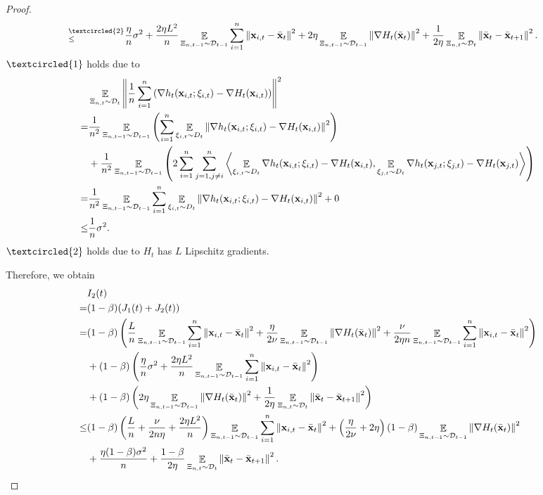 \documentclass{article}
\begin{document}
\begin{proof}
\begin{align}
\refabovecir{\le}{\textcircled{2}} & \frac{\eta}{n} \sigma^2 + \frac{2\eta L^2}{n}\EE_{ \Xi_{n,t-1} \sim \Dcal_{t-1} }\sum_{i=1}^n \lrnorm{\x_{i,t} - \bar{\x}_t }^2 + 2\eta \EE_{ \Xi_{n,t-1} \sim \Dcal_{t-1} }\lrnorm{\nabla H_t(\bar{\x}_t)}^2 + \frac{1}{2\eta} \EE_{ \Xi_{n,t} \sim \Dcal_{t} }\lrnorm{ \bar{\x}_t - \bar{\x}_{t+1}}^2.
\end{align} $\textcircled{1}$ holds due to
\begin{align}
\nonumber
& \mathop{\mathbb{E}}_{ \Xi_{n,t} \sim \mathcal{D}_{t} }\left\lVert\frac{1}{n}\sum_{i=1}^n \left(  \nabla h_t({\bf x}_{i,t};\xi_{i,t}) - \nabla H_t({\bf x}_{i,t})  \right) \right\rVert^2 \\ \nonumber
= & \frac{1}{n^2}\mathop{\mathbb{E}}_{ \Xi_{n,t-1} \sim \mathcal{D}_{t-1} }\left(  \sum_{i=1}^n \mathop{\mathbb{E}}_{ \xi_{i,t} \sim D_t }\left\lVert \nabla h_t({\bf x}_{i,t};\xi_{i,t}) - \nabla H_t({\bf x}_{i,t}) \right\rVert^2   \right) \\ \nonumber 
& + \frac{1}{n^2}\mathop{\mathbb{E}}_{ \Xi_{n,t-1} \sim \mathcal{D}_{t-1} }\left( 2\sum_{i=1}^n\sum_{j=1, j\neq i}^n\left\langle \mathop{\mathbb{E}}_{ \xi_{i,t} \sim D_t }\nabla h_t({\bf x}_{i,t};\xi_{i,t}) - \nabla H_t({\bf x}_{i,t}),  \mathop{\mathbb{E}}_{ \xi_{j,t} \sim D_t } \nabla h_t({\bf x}_{j,t};\xi_{j,t}) - \nabla H_t({\bf x}_{j,t}) \right\rangle  \right) \\ \nonumber
= & \frac{1}{n^2}\mathop{\mathbb{E}}_{ \Xi_{n,t-1} \sim \mathcal{D}_{t-1} }\sum_{i=1}^n \mathop{\mathbb{E}}_{ \xi_{i,t} \sim D_t }\left\lVert \nabla h_t({\bf x}_{i,t};\xi_{i,t}) - \nabla H_t({\bf x}_{i,t}) \right\rVert^2 + 0 \\ \nonumber
\le & \frac{1}{n} \sigma^2.
\end{align} $\textcircled{2}$ holds due to $H_t$ has $L$ Lipschitz gradients.

 Therefore, we obtain
\begin{align}
\nonumber
& I_2(t) \\ \nonumber 
= & (1-\beta)(J_1(t) + J_2(t)) \\ \nonumber
= &  (1-\beta)\left(  \frac{L}{n}\mathop{\mathbb{E}}_{ \Xi_{n,t-1} \sim \mathcal{D}_{t-1} }\sum_{i=1}^n \left\lVert{\bf x}_{i,t} - \bar{{\bf x}}_t\right\rVert^2 + \frac{\eta}{2\nu}\mathop{\mathbb{E}}_{ \Xi_{n,t-1} \sim \mathcal{D}_{t-1} }\left\lVert\nabla H_t(\bar{{\bf x}}_t)\right\rVert^2 + \frac{\nu}{2\eta n}\mathop{\mathbb{E}}_{ \Xi_{n,t-1} \sim \mathcal{D}_{t-1} }\sum_{i=1}^n\left\lVert{\bf x}_{i,t} - \bar{{\bf x}}_t \right\rVert^2  \right) \\ \nonumber
& + (1-\beta)\left(  \frac{\eta}{n} \sigma^2 + \frac{2\eta L^2}{n}\mathop{\mathbb{E}}_{ \Xi_{n,t-1} \sim \mathcal{D}_{t-1} }\sum_{i=1}^n \left\lVert{\bf x}_{i,t} - \bar{{\bf x}}_t \right\rVert^2  \right) \\ \nonumber 
& + (1-\beta)\left(  2\eta \mathop{\mathbb{E}}_{ \Xi_{n,t-1} \sim \mathcal{D}_{t-1} }\left\lVert\nabla H_t(\bar{{\bf x}}_t)\right\rVert^2 + \frac{1}{2\eta} \mathop{\mathbb{E}}_{ \Xi_{n,t} \sim \mathcal{D}_{t} }\left\lVert \bar{{\bf x}}_t - \bar{{\bf x}}_{t+1}\right\rVert^2  \right) \\ \nonumber
\le &  (1-\beta)\left(  \frac{L}{n} + \frac{\nu}{2n\eta} + \frac{2\eta L^2}{n}  \right)\mathop{\mathbb{E}}_{ \Xi_{n,t-1} \sim \mathcal{D}_{t-1} }\sum_{i=1}^n\left\lVert{\bf x}_{i,t} - \bar{{\bf x}}_t \right\rVert^2   + \left(  \frac{\eta}{2\nu} + 2\eta  \right)(1-\beta)\mathop{\mathbb{E}}_{ \Xi_{n,t-1} \sim \mathcal{D}_{t-1} }\left\lVert\nabla H_t(\bar{{\bf x}}_t)\right\rVert^2 \\ \nonumber 
&+ \frac{\eta (1-\beta)\sigma^2}{n} +  \frac{1-\beta}{2\eta} \mathop{\mathbb{E}}_{ \Xi_{n,t} \sim \mathcal{D}_{t} }\left\lVert \bar{{\bf x}}_t - \bar{{\bf x}}_{t+1}\right\rVert^2.
\end{align}


\end{proof}
\end{document}
